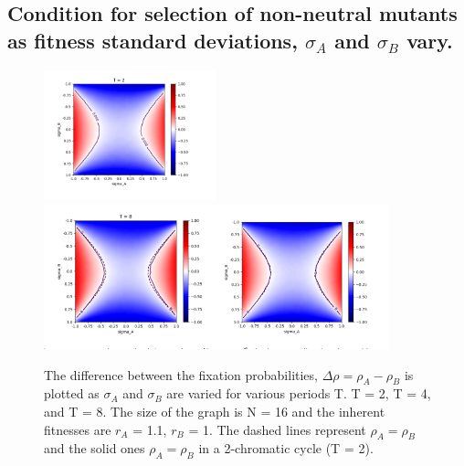 \documentclass{article}
\begin{document}
\subsection{Condition for selection of non-neutral mutants as fitness standard deviations, $\sigma_A$ and $\sigma_B$ vary.}
\begin{figure}[H]
    \centering
  {{\includegraphics[width=5cm]{heat map.PNG}\\ }}%
    \qquad
  {{\includegraphics[width=10cm]{heat map 2.PNG} }}%
    \caption{The difference between the fixation probabilities, $\Delta\rho = \rho_A - \rho_B$ is plotted as $\sigma_A$ and $\sigma_B$ are varied for various periods T. T = 2, T = 4, and T = 8. The size of the graph is N = 16 and the inherent fitnesses are $r_A$ = 1.1, $r_B$ = 1. The dashed lines represent $\rho_A = \rho_B$ and the solid ones $\rho_A = \rho_B$ in a 2-chromatic cycle (T = 2).}%
\end{figure}
\end{document}
